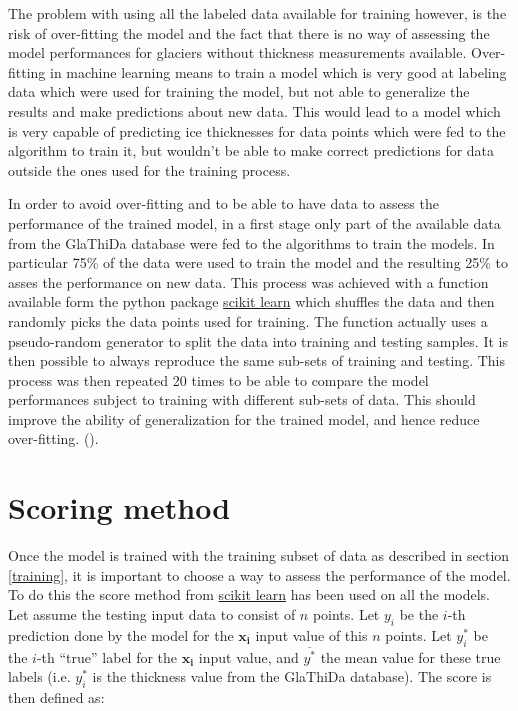 The problem with using all the labeled data available for training however, is the risk of over-fitting the model and the fact that there is no way of assessing the model performances for glaciers without thickness measurements available.
Over-fitting in machine learning means to train a model which is very good at labeling data which were used for training the model, but not able to generalize the results and make predictions about new data. This would lead to a model which is very capable of predicting ice thicknesses for data points which were fed to the algorithm to train it, but wouldn't be able to make correct predictions for data outside the ones used for the training process. 

In order to avoid over-fitting and to be able to have data to assess the performance of the trained model, in a first stage only part of the available data from the GlaThiDa database were fed to the algorithms to train the models. In particular 75\% of the data were used to train the model and the resulting 25\% to asses the performance on new data. This process was achieved with a function available form the python package \href{https://scikit-learn.org/}{scikit learn} which shuffles the data and then randomly picks the data points used for training. The function actually uses a pseudo-random generator to split the data into training and testing samples. It is then possible to always reproduce the same sub-sets of training and testing. This process was then repeated 20 times to be able to compare the model performances subject to training with different sub-sets of data. This should improve the ability of generalization for the trained model, and hence reduce over-fitting. (\citet{crossval1995}).

\section{Scoring method}\label{scoring}
Once the model is trained with the training subset of data as described in section \ref{training}, it is important to choose a way to assess the performance of the model. To do this the score method from \href{https://scikit-learn.org/}{scikit learn} has been used on all the models. Let assume the testing input data to consist of $n$ points. Let $y_i$ be the $i$-th prediction done by the model for the $\mathbf{x_i}$ input value of this $n$ points. Let $y^*_i$ be the $i$-th ``true'' label for the $\mathbf{x_i}$ input value, and $\overline{y^*}$ the mean value for these true labels (i.e. $y^*_i$ is the thickness value from the GlaThiDa database). The score is then defined as:


